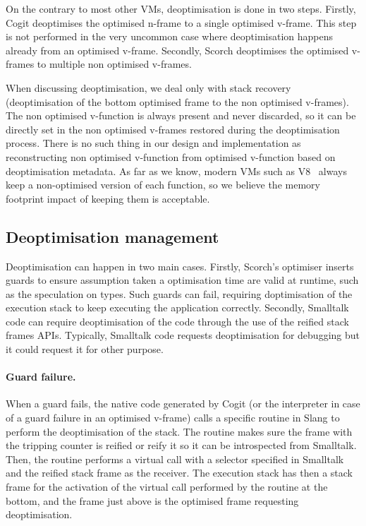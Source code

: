 \documentclass[a4paper,12pt,twoside]{../includes/ThesisStyle}
\begin{document}
On the contrary to most other VMs, deoptimisation is done in two steps. Firstly, Cogit deoptimises the optimised n-frame to a single optimised v-frame. This step is not performed in the very uncommon case where deoptimisation happens already from an optimised v-frame. Secondly, Scorch deoptimises the optimised v-frames to multiple non optimised v-frames.

When discussing deoptimisation, we deal only with stack recovery (deoptimisation of the bottom optimised frame to the non optimised v-frames). The non optimised v-function is always present and never discarded, so it can be directly set in the non optimised v-frames restored during the deoptimisation process. There is no such thing in our design and implementation as reconstructing non optimised v-function from optimised v-function based on deoptimisation metadata. As far as we know, modern VMs such as V8~\cite{V8} always keep a non-optimised version of each function, so we believe the memory footprint impact of keeping them is acceptable.

\subsection{Deoptimisation management}

Deoptimisation can happen in two main cases. Firstly, Scorch's optimiser inserts guards to ensure assumption taken a optimisation time are valid at runtime, such as the speculation on types. Such guards can fail, requiring doptimisation of the execution stack to keep executing the application correctly. Secondly, Smalltalk code can require deoptimisation of the code through the use of the reified stack frames APIs. Typically, Smalltalk code requests deoptimisation for debugging but it could request it for other purpose.

\paragraph{Guard failure.} When a guard fails, the native code generated by Cogit (or the interpreter in case of a guard failure in an optimised v-frame) calls a specific routine in Slang to perform the deoptimisation of the stack. The routine makes sure the frame with the tripping counter is reified or reify it so it can be introspected from Smalltalk. Then, the routine performs a virtual call with a selector specified in Smalltalk and the reified stack frame as the receiver. The execution stack has then a stack frame for the activation of the virtual call performed by the routine at the bottom, and the frame just above is the optimised frame requesting deoptimisation. 
\end{document}
